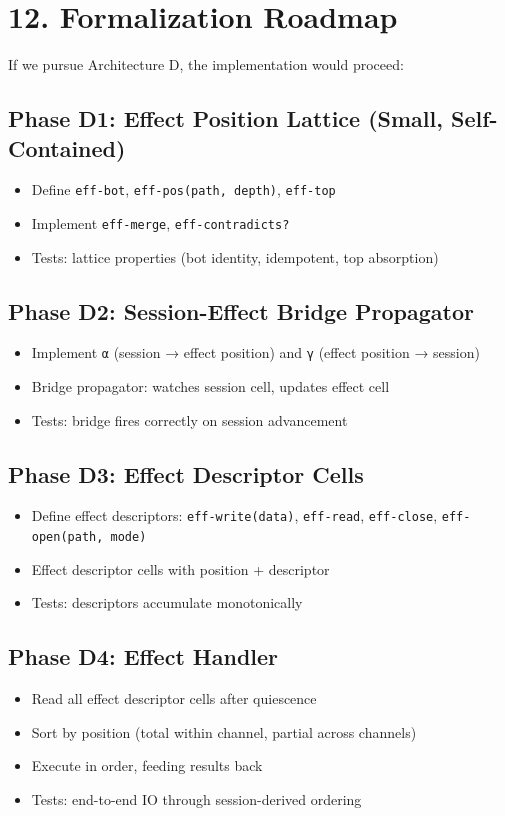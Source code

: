 \documentclass[11pt]{article}
\begin{document}
\section{12. Formalization Roadmap}
\label{sec:orge18c142}

If we pursue Architecture D, the implementation would proceed:
\subsection{Phase D1: Effect Position Lattice (Small, Self-Contained)}
\label{sec:orga9634ae}
\begin{itemize}
\item Define \texttt{eff-bot}, \texttt{eff-pos(path, depth)}, \texttt{eff-top}
\item Implement \texttt{eff-merge}, \texttt{eff-contradicts?}
\item Tests: lattice properties (bot identity, idempotent, top absorption)
\end{itemize}
\subsection{Phase D2: Session-Effect Bridge Propagator}
\label{sec:org10ea223}
\begin{itemize}
\item Implement \texttt{α} (session → effect position) and \texttt{γ} (effect position → session)
\item Bridge propagator: watches session cell, updates effect cell
\item Tests: bridge fires correctly on session advancement
\end{itemize}
\subsection{Phase D3: Effect Descriptor Cells}
\label{sec:org2f9effe}
\begin{itemize}
\item Define effect descriptors: \texttt{eff-write(data)}, \texttt{eff-read}, \texttt{eff-close}, \texttt{eff-open(path, mode)}
\item Effect descriptor cells with position + descriptor
\item Tests: descriptors accumulate monotonically
\end{itemize}
\subsection{Phase D4: Effect Handler}
\label{sec:orgc869d4e}
\begin{itemize}
\item Read all effect descriptor cells after quiescence
\item Sort by position (total within channel, partial across channels)
\item Execute in order, feeding results back
\item Tests: end-to-end IO through session-derived ordering
\end{itemize}
\end{document}

